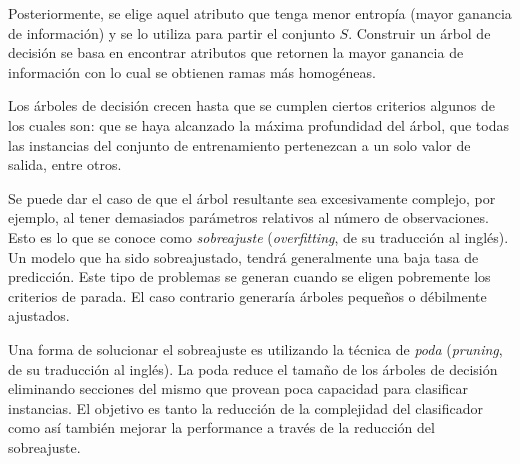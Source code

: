 	Posteriormente, se elige aquel atributo que tenga menor entropía (mayor ganancia de información) y se lo utiliza para partir el conjunto $S$. Construir un árbol de decisión se basa en encontrar atributos que retornen la mayor ganancia de información con lo cual se obtienen ramas más homogéneas.
	
	Los árboles de decisión crecen hasta que se cumplen ciertos criterios algunos de los cuales son: que se haya alcanzado la máxima profundidad del árbol, que todas las instancias del conjunto de entrenamiento pertenezcan a un solo valor de salida, entre otros.

	Se puede dar el caso de que el árbol resultante sea excesivamente complejo, por ejemplo, al tener demasiados parámetros relativos al número de observaciones. Esto es lo que se conoce como \textit{sobreajuste} (\textit{overfitting}, de su traducción al inglés). Un modelo que ha sido sobreajustado, tendrá generalmente una baja tasa de predicción. Este tipo de problemas se generan cuando se eligen pobremente los criterios de parada. El caso contrario generaría árboles pequeños o débilmente ajustados.
	
	Una forma de solucionar el sobreajuste es utilizando la técnica de \textit{poda} (\textit{pruning}, de su traducción al inglés). La poda reduce el tamaño de los árboles de decisión eliminando secciones del mismo que provean poca capacidad para clasificar instancias. El objetivo es tanto la reducción de la complejidad del clasificador como así también mejorar la performance a través de la reducción del sobreajuste.
	
